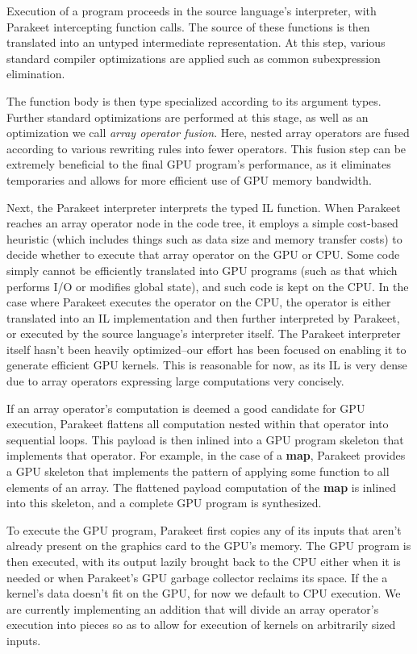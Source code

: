 \documentclass[preprint]{sigplanconf}
\begin{document}
Execution of a program proceeds in the source language's interpreter, with
Parakeet intercepting function calls.  The source of these functions is then
translated into an untyped intermediate representation. At this step,
various standard compiler optimizations are applied such as common subexpression
elimination.

The function body is then type specialized according to its argument
types.  Further standard optimizations are performed at this stage, as well as
an optimization we call \emph{array operator fusion}.  Here, nested array
operators are fused according to various rewriting rules into fewer operators.
This fusion step can be extremely beneficial to the final GPU
program's performance, as it eliminates temporaries and allows for more
efficient use of GPU memory bandwidth.

Next, the Parakeet interpreter interprets the typed IL function.  When
Parakeet reaches an array operator node in the code tree, it employs a simple
cost-based heuristic (which includes things such as data size and memory
transfer costs) to decide whether to execute that array operator on the GPU or
CPU.  Some code simply cannot be efficiently translated into GPU programs
(such as that which performs I/O or modifies global state), and such code is
kept on the CPU. In the case where Parakeet executes the operator on the CPU,
the operator is either translated into an IL implementation and then further
interpreted by Parakeet, or executed by the source language's interpreter
itself. The Parakeet interpreter itself hasn't been heavily optimized--our
effort has been focused on enabling it to generate efficient GPU kernels.  This
is reasonable for now, as its IL is very dense due to array operators
expressing large computations very concisely.

If an array operator's computation is deemed a good candidate for GPU
execution, Parakeet flattens all computation nested within that operator
into sequential loops.  This payload is then inlined into a GPU
program skeleton that implements that operator.  For example, in the case of a
\textbf{map}, Parakeet provides a GPU skeleton that implements the pattern of
applying some function to all elements of an array.  The
flattened payload computation of the \textbf{map} is inlined into this
skeleton, and a complete GPU program is synthesized.

To execute the GPU program, Parakeet first copies any of its inputs
that aren't already present on the graphics card to the GPU's memory.  The GPU
program is then executed, with its output lazily brought back to the CPU either
when it is needed or when Parakeet's GPU garbage collector reclaims its space.
If the a kernel's data doesn't fit on the GPU, for now we default to CPU
execution.  We are currently implementing an addition that will divide
an array operator's execution into pieces so as to allow for execution of
kernels on arbitrarily sized inputs.
\end{document}
